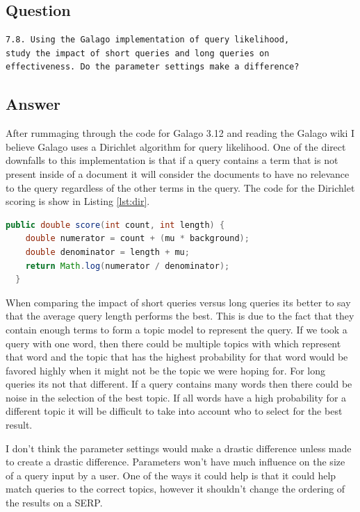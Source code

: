 \documentclass[letterpaper,11pt]{article}
\begin{document}
\subsection*{Question}

\begin{verbatim}
7.8. Using the Galago implementation of query likelihood,
study the impact of short queries and long queries on 
effectiveness. Do the parameter settings make a difference?
\end{verbatim}

\subsection*{Answer}

After rummaging through the code for Galago 3.12 and reading the Galago wiki \cite{galago} I believe Galago uses a Dirichlet algorithm for query likelihood.
One of the direct downfalls to this implementation is that if a query contains a term that is not present inside of a document it will consider the documents to have no relevance to the query regardless of the other terms in the query.
The code for the Dirichlet scoring is show in Listing \ref{lst:dir}.

\begin{lstlisting}[language=java, caption={Scoring Algorithm in DirichletScorer.java}, label={lst:dir}]
  public double score(int count, int length) {
    double numerator = count + (mu * background);
    double denominator = length + mu;
    return Math.log(numerator / denominator);
  }
\end{lstlisting}

When comparing the impact of short queries versus long queries its better to say that the average query length performs the best.
This is due to the fact that they contain enough terms to form a topic model to represent the query.
If we took a query with one word, then there could be multiple topics with which represent that word and the topic that has the highest probability for that word would be favored highly when it might not be the topic we were hoping for.
For long queries its not that different.
If a query contains many words then there could be noise in the selection of the best topic.
If all words have a high probability for a different topic it will be difficult to take into account who to select for the best result.

I don't think the parameter settings would make a drastic difference unless made to create a drastic difference.
Parameters won't have much influence on the size of a query input by a user.
One of the ways it could help is that it could help match queries to the correct topics, however it shouldn't change the ordering of the results on a SERP.
\end{document}
